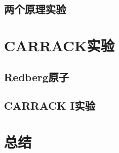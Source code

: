 \documentclass[twocolumn,12pt,a4paper]{article}
\begin{document}
\subsection{两个原理实验}

\section{CARRACK实验}
\subsection{Redberg原子}
\subsection{CARRACK I实验}

\section{总结}

\medskip
\balance
\renewcommand{\refname}{参考文献}
\printbibliography
\end{document}
